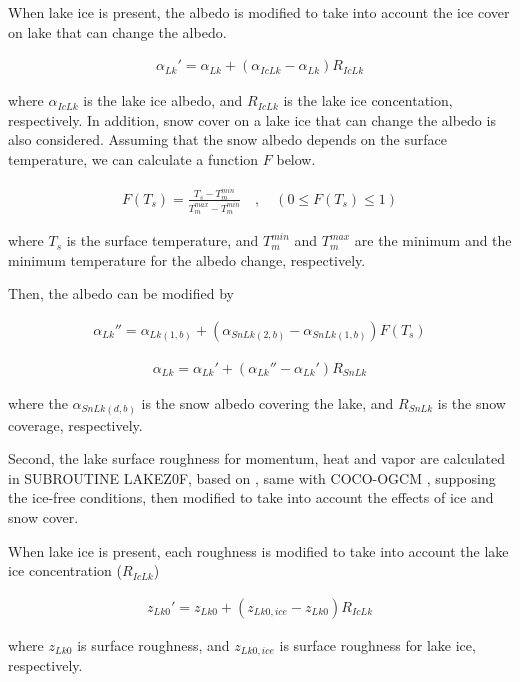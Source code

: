 When lake ice is present, the albedo is modified to take into account the ice cover on lake that can change the albedo.

\begin{eqnarray}
    {\alpha_{Lk}'} = \alpha_{Lk} + (\alpha_{IcLk}-\alpha_{Lk}) R_{IcLk}
\end{eqnarray}

where \(\alpha_{IcLk}\) is the lake ice albedo, and \(R_{IcLk}\) is the lake ice concentation, respectively. In addition, snow cover on a lake ice that can change the albedo is also considered.
Assuming that the snow albedo depends on the surface temperature, we can calculate a function \(F\) below.

\begin{eqnarray}
    F(T_s) = \frac{T_s-T_m^{min}}{T_m^{max}-T_m^{min}} \quad,\quad (0 \le F(T_s)\le 1)
\end{eqnarray}

where \(T_s\) is the surface temperature, and \(T_m^{min}\) and \(T_m^{max}\) are the minimum and the minimum temperature for the albedo change, respectively.

Then, the albedo can be modified by

\begin{eqnarray}
    {\alpha_{Lk}''} = \alpha_{Lk(1,b)} + (\alpha_{SnLk(2,b)}-\alpha_{SnLk(1,b)})F(T_s)
\end{eqnarray}

\begin{eqnarray}
    \alpha_{Lk} = {\alpha_{Lk}'} +(\alpha_{Lk}''-\alpha_{Lk}')R_{SnLk}
\end{eqnarray}

where the \(\alpha_{SnLk(d,b)}\) is the snow albedo covering the lake, and \(R_{SnLk}\) is the snow coverage, respectively.

Second, the lake surface roughness for momentum, heat and vapor are calculated in SUBROUTINE LAKEZ0F, based on \citet{Miller1992-gi}, same with COCO-OGCM \citep{Hasumi2015-fs}, supposing the ice-free
conditions, then modified to take into account the effects of ice and snow cover.

When lake ice is present, each roughness is modified to take into account the lake ice concentration (\(R_{IcLk}\))

\begin{eqnarray}
    {z_{Lk0}'} = z_{Lk0} + (z_{Lk0,ice} -z_{Lk0}) R_{IcLk}
\end{eqnarray}

where \(z_{Lk0}\) is surface roughness, and \(z_{Lk0,ice}\) is surface roughness for lake ice, respectively.

